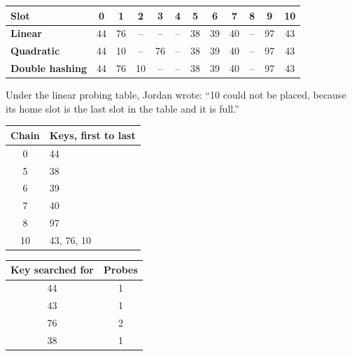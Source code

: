 \documentclass[11pt]{article}
\newenvironment{inlinefig}{\par\noindent\begin{minipage}{\linewidth}\centering}{\end{minipage}\par\medskip}
\begin{document}
\begin{inlinefig}
\label{tab:jordan}
\small\renewcommand{\arraystretch}{1.25}\setlength{\tabcolsep}{5pt}
\begin{tabular}{l c c c c c c c c c c c}
\toprule
\textbf{Slot} & \textbf{0} & \textbf{1} & \textbf{2} & \textbf{3} & \textbf{4} & \textbf{5} &
\textbf{6} & \textbf{7} & \textbf{8} & \textbf{9} & \textbf{10} \\
\midrule
\textbf{Linear} & 44 & 76 & -- & -- & -- & 38 & 39 & 40 & -- & 97 & 43 \\
\textbf{Quadratic} & 44 & 10 & -- & 76 & -- & 38 & 39 & 40 & -- & 97 & 43 \\
\textbf{Double hashing} & 44 & 76 & 10 & -- & -- & 38 & 39 & 40 & -- & 97 & 43 \\
\bottomrule
\end{tabular}
\end{inlinefig}

Under the linear probing table, Jordan wrote: ``10 could not be placed, because its home slot
is the last slot in the table and it is full.''

\begin{inlinefig}
\label{tab:jordanchain}
\renewcommand{\arraystretch}{1.25}
\begin{tabular}{c l}
\toprule
\textbf{Chain} & \textbf{Keys, first to last} \\
\midrule
0 & 44 \\
5 & 38 \\
6 & 39 \\
7 & 40 \\
8 & 97 \\
10 & 43, 76, 10 \\
\bottomrule
\end{tabular}
\end{inlinefig}

\begin{inlinefig}
\label{tab:jordanprobes}
\renewcommand{\arraystretch}{1.25}
\begin{tabular}{c c}
\toprule
\textbf{Key searched for} & \textbf{Probes} \\
\midrule
44 & 1 \\
43 & 1 \\
76 & 2 \\
38 & 1 \\
\bottomrule
\end{tabular}
\end{inlinefig}
\end{document}
